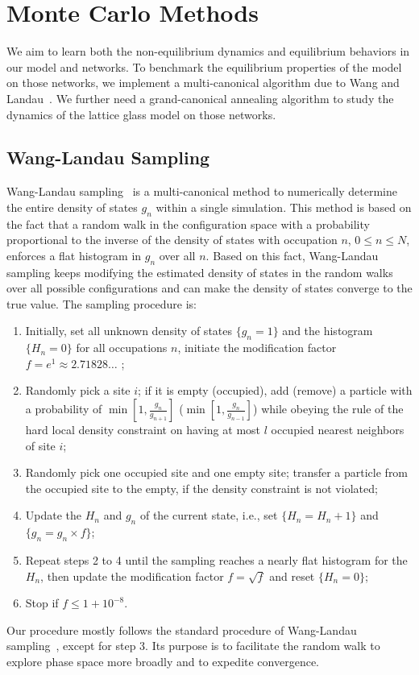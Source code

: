 \section{Monte Carlo Methods}
\label{sec:jam_methods} 

We aim to learn both the non-equilibrium dynamics and equilibrium behaviors in our model and networks. To benchmark the equilibrium properties of the model on those networks, we implement a multi-canonical algorithm due to Wang and Landau~\cite{Wang2001, wang01a}. We further need a grand-canonical annealing algorithm to study the dynamics of the
lattice glass model on those networks.

\subsection{Wang-Landau Sampling}
\label{sub:WLsampling}Wang-Landau sampling~\cite{Wang2001} is a
multi-canonical method to numerically determine the entire density
of states $g_{n}$ within a single simulation. This method is based
on the fact that a random walk in the configuration space with a probability
proportional to the inverse of the density of states with occupation
$n$, $0\leq n\leq N$, enforces a flat histogram in $g_{n}$ over
all $n$. Based on this fact, Wang-Landau sampling keeps modifying
the estimated density of states in the random walks over all possible
configurations and can make the density of states converge to the
true value. The sampling procedure is: 
\begin{enumerate}
\item Initially, set all unknown density of states $\{g_{n}=1\}$ and the
histogram $\{H_{n}=0\}$ for all occupations $n$, initiate the modification
factor $f=e^1\approx2.71828\dots$ ; 
\item Randomly pick a site $i$; if it is empty (occupied), add (remove)
a particle with a probability of $\min\left[1,\frac{g_{n}}{g_{n+1}}\right]$
($\min\left[1,\frac{g_{n}}{g_{n-1}}\right]$) while obeying the rule
of the hard local density constraint on having at most $l$ occupied
nearest neighbors of site $i$; 
\item Randomly pick one occupied site and one empty site; transfer
a particle from the occupied site to the empty, if the density constraint is not violated; 
\item Update the $H_{n}$ and $g_{n}$ of the current state, i.e., set $\{H_{n}=H_{n}+1\}$
and $\{g_{n}=g_{n}\times f\}$; 
\item Repeat steps 2 to 4 until the sampling reaches a nearly flat histogram
for the $H_{n}$, then update the modification factor $f=\sqrt{f}$
and reset $\{H_{n}=0\}$; 
\item Stop if $f\le1+10^{-8}$. 
\end{enumerate}
Our procedure mostly follows the standard procedure of Wang-Landau
sampling~\cite{Wang2001}, except for step 3. Its purpose is to facilitate
the random walk to explore phase space more broadly and to expedite
convergence.

